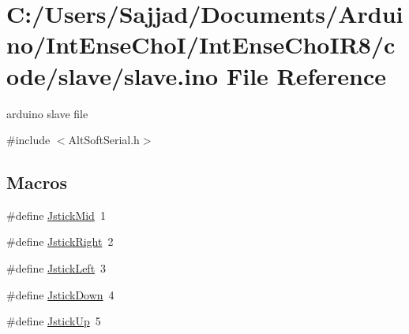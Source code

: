 \hypertarget{slave_8ino}{}\section{C\+:/\+Users/\+Sajjad/\+Documents/\+Arduino/\+Int\+Ense\+Cho\+I/\+Int\+Ense\+Cho\+I\+R8/code/slave/slave.ino File Reference}
\label{slave_8ino}


arduino slave file  


{\ttfamily \#include $<$Alt\+Soft\+Serial.\+h$>$}\newline
\subsection*{Macros}
\begin{DoxyCompactItemize}
\item 
\#define \mbox{\hyperlink{slave_8ino_ac4a0d1542e118f06f6f0997629d9ab84}{Jstick\+Mid}}~1
\item 
\#define \mbox{\hyperlink{slave_8ino_a9b93a0effb9c09248bcba85a28c48b8d}{Jstick\+Right}}~2
\item 
\#define \mbox{\hyperlink{slave_8ino_ad0d7429c7c26609751ca64fa94acb32c}{Jstick\+Left}}~3
\item 
\#define \mbox{\hyperlink{slave_8ino_acc8a88b497450472b81c5f95b9c3a605}{Jstick\+Down}}~4
\item 
\#define \mbox{\hyperlink{slave_8ino_a74824f5ea0f46df119320d99c9c287f3}{Jstick\+Up}}~5
\end{DoxyCompactItemize}

